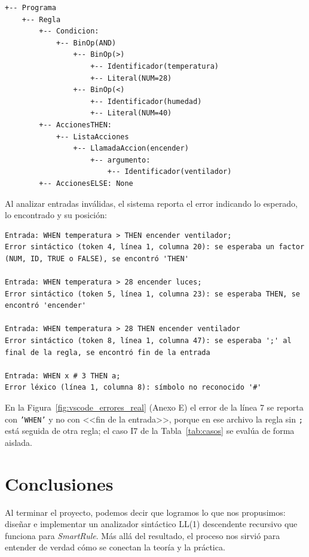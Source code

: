 \documentclass[12pt,a4paper]{article}
\begin{document}
\begin{lstlisting}[style=grammartyle, caption={AST de la regla \texttt{WHEN temperatura > 28 AND humedad < 40 THEN encender ventilador;}}]
+-- Programa
    +-- Regla
        +-- Condicion:
            +-- BinOp(AND)
                +-- BinOp(>)
                    +-- Identificador(temperatura)
                    +-- Literal(NUM=28)
                +-- BinOp(<)
                    +-- Identificador(humedad)
                    +-- Literal(NUM=40)
        +-- AccionesTHEN:
            +-- ListaAcciones
                +-- LlamadaAccion(encender)
                    +-- argumento:
                        +-- Identificador(ventilador)
        +-- AccionesELSE: None
\end{lstlisting}

Al analizar entradas inválidas, el sistema reporta el error indicando lo esperado, lo encontrado y su posición:

\begin{lstlisting}[style=grammartyle, caption={Detección de errores léxicos y sintácticos}]
Entrada: WHEN temperatura > THEN encender ventilador;
Error sintáctico (token 4, línea 1, columna 20): se esperaba un factor (NUM, ID, TRUE o FALSE), se encontró 'THEN'

Entrada: WHEN temperatura > 28 encender luces;
Error sintáctico (token 5, línea 1, columna 23): se esperaba THEN, se encontró 'encender'

Entrada: WHEN temperatura > 28 THEN encender ventilador
Error sintáctico (token 8, línea 1, columna 47): se esperaba ';' al final de la regla, se encontró fin de la entrada

Entrada: WHEN x # 3 THEN a;
Error léxico (línea 1, columna 8): símbolo no reconocido '#'
\end{lstlisting}

En la Figura~\ref{fig:vscode_errores_real} (Anexo E) el error de la línea 7 se reporta con \texttt{'WHEN'} y no con <<fin de la entrada>>, porque en ese archivo la regla sin \texttt{;} está seguida de otra regla; el caso I7 de la Tabla~\ref{tab:casos} se evalúa de forma aislada.

\newpage

\section{Conclusiones}

Al terminar el proyecto, podemos decir que logramos lo que nos propusimos: diseñar e implementar un analizador sintáctico LL(1) descendente recursivo que funciona para \textit{SmartRule}. Más allá del resultado, el proceso nos sirvió para entender de verdad cómo se conectan la teoría y la práctica.
\end{document}
